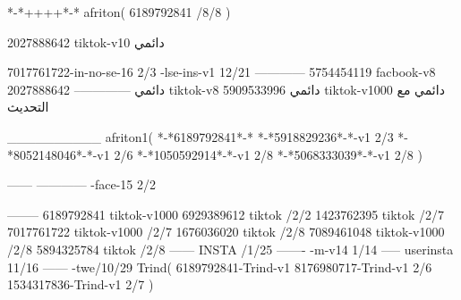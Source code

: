 *-*++++*-*
afriton(
6189792841 /8/8
)

2027888642 tiktok-v10
دائمي

7017761722-in-no-se-16 2/3
-lse-ins-v1 12/21
------------
5754454119 facbook-v8
دائمي
--------------
2027888642 tiktok-v8
دائمي
5909533996 tiktok-v1000
دائمي مع التحديث

__________
afriton1(
*-*6189792841*-*
*-*5918829236*-*-v1 2/3
*-*8052148046*-*-v1 2/6
*-*1050592914*-*-v1 2/8
*-*5068333039*-*-v1 2/8
)

------
------------
-face-15 2/2

--------
6189792841 tiktok-v1000
6929389612 tiktok /2/2
1423762395 tiktok /2/7
7017761722 tiktok-v1000 /2/7
1676036020 tiktok /2/8
7089461048 tiktok-v1000 /2/8
5894325784 tiktok /2/8
------
 INSTA /1/25
-------
-m-v14 1/14
-----
userinsta 11/16
------
-twe/10/29
Trind(
6189792841-Trind-v1 
8176980717-Trind-v1 2/6
1534317836-Trind-v1 2/7
)
